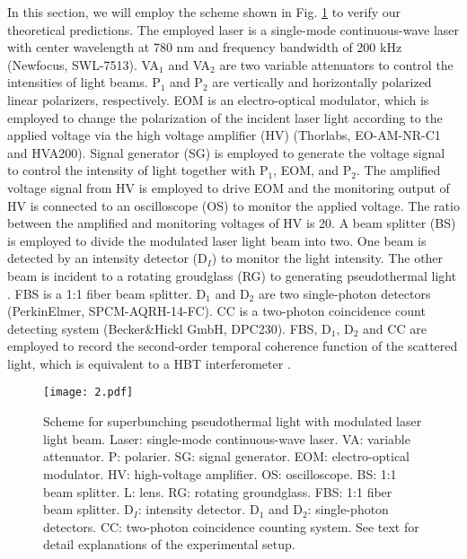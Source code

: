 \documentclass[12pt]{iopart}
\begin{document}
In this section, we will employ the scheme shown in Fig. \ref{setup} to verify our theoretical predictions. The employed laser is a single-mode continuous-wave laser with center wavelength at 780 nm and frequency bandwidth of 200 kHz (Newfocus, SWL-7513). VA$_1$ and VA$_2$ are two variable attenuators to control the intensities of light beams. P$_1$ and P$_2$ are vertically and horizontally polarized linear polarizers, respectively. EOM is an electro-optical modulator, which is employed to change the polarization of the incident laser light according to the applied voltage via the high voltage amplifier (HV) (Thorlabs, EO-AM-NR-C1 and HVA200). Signal generator (SG) is employed to generate the voltage signal to control the intensity of light together with P$_1$, EOM, and P$_2$. The amplified voltage signal from HV is employed to drive EOM and the monitoring output of HV is connected to an oscilloscope (OS) to monitor the applied voltage. The ratio between the amplified and monitoring voltages of HV is 20. A beam splitter (BS) is employed to divide the modulated laser light beam into two. One beam is detected by an intensity detector (D$_I$) to monitor the light intensity. The other beam is incident to a rotating groudglass (RG) to generating pseudothermal light \cite{martienssen}. FBS is a 1:1 fiber beam splitter. D$_1$ and D$_2$ are two single-photon detectors (PerkinElmer, SPCM-AQRH-14-FC). CC is a two-photon coincidence count detecting system (Becker\&Hickl GmbH, DPC230). FBS, D$_1$, D$_2$ and CC are employed to record the second-order temporal coherence function of the scattered light, which is equivalent to a HBT interferometer \cite{HBT}. 

\begin{figure}[htbp]
\centering
\texttt{[image: 2.pdf]}
\caption{Scheme for superbunching pseudothermal light with modulated laser light beam. Laser: single-mode continuous-wave laser. VA: variable attenuator. P: polarier. SG: signal generator. EOM: electro-optical modulator. HV: high-voltage amplifier. OS: oscilloscope. BS: 1:1 beam splitter. L: lens. RG: rotating groundglass. FBS: 1:1 fiber beam splitter. D$_I$: intensity detector. D$_1$ and D$_2$: single-photon detectors. CC: two-photon coincidence counting system. See text for detail explanations of the experimental setup.}\label{setup}
\end{figure}
\end{document}
